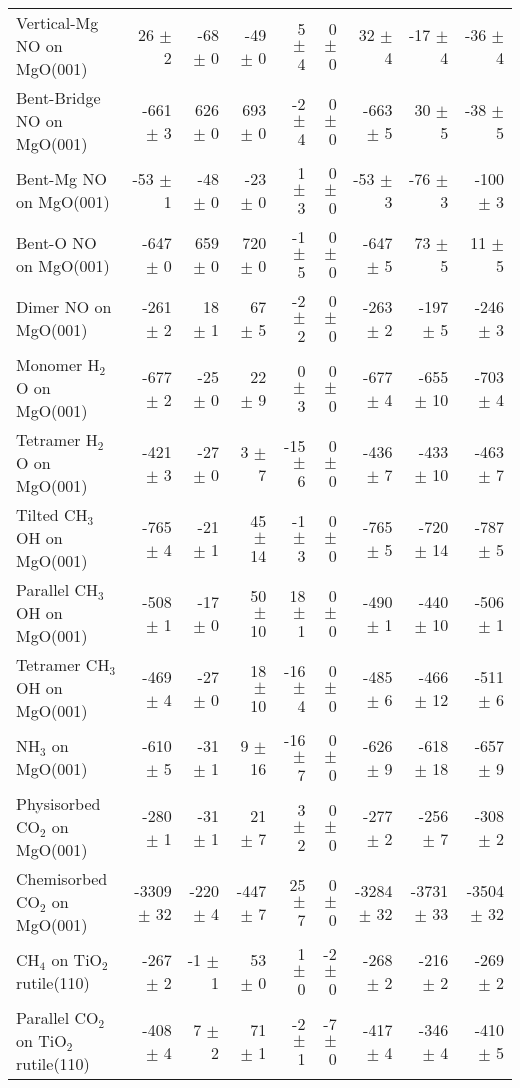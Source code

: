 \begin{table}
\begin{adjustbox}{center,max width=0.9\textwidth}
\begin{tabular}{lrrrrrrrr}
Vertical-Mg NO on MgO(001) & 26 $\pm$ 2 & -68 $\pm$ 0 & -49 $\pm$ 0 & 5 $\pm$ 4 & 0 $\pm$ 0 & 32 $\pm$ 4 & -17 $\pm$ 4 & -36 $\pm$ 4 \\
Bent-Bridge NO on MgO(001) & -661 $\pm$ 3 & 626 $\pm$ 0 & 693 $\pm$ 0 & -2 $\pm$ 4 & 0 $\pm$ 0 & -663 $\pm$ 5 & 30 $\pm$ 5 & -38 $\pm$ 5 \\
Bent-Mg NO on MgO(001) & -53 $\pm$ 1 & -48 $\pm$ 0 & -23 $\pm$ 0 & 1 $\pm$ 3 & 0 $\pm$ 0 & -53 $\pm$ 3 & -76 $\pm$ 3 & -100 $\pm$ 3 \\
Bent-O NO on MgO(001) & -647 $\pm$ 0 & 659 $\pm$ 0 & 720 $\pm$ 0 & -1 $\pm$ 5 & 0 $\pm$ 0 & -647 $\pm$ 5 & 73 $\pm$ 5 & 11 $\pm$ 5 \\
Dimer NO on MgO(001) & -261 $\pm$ 2 & 18 $\pm$ 1 & 67 $\pm$ 5 & -2 $\pm$ 2 & 0 $\pm$ 0 & -263 $\pm$ 2 & -197 $\pm$ 5 & -246 $\pm$ 3 \\
Monomer H$_2$O on MgO(001) & -677 $\pm$ 2 & -25 $\pm$ 0 & 22 $\pm$ 9 & 0 $\pm$ 3 & 0 $\pm$ 0 & -677 $\pm$ 4 & -655 $\pm$ 10 & -703 $\pm$ 4 \\
Tetramer H$_2$O on MgO(001) & -421 $\pm$ 3 & -27 $\pm$ 0 & 3 $\pm$ 7 & -15 $\pm$ 6 & 0 $\pm$ 0 & -436 $\pm$ 7 & -433 $\pm$ 10 & -463 $\pm$ 7 \\
Tilted CH$_3$OH on MgO(001) & -765 $\pm$ 4 & -21 $\pm$ 1 & 45 $\pm$ 14 & -1 $\pm$ 3 & 0 $\pm$ 0 & -765 $\pm$ 5 & -720 $\pm$ 14 & -787 $\pm$ 5 \\
Parallel CH$_3$OH on MgO(001) & -508 $\pm$ 1 & -17 $\pm$ 0 & 50 $\pm$ 10 & 18 $\pm$ 1 & 0 $\pm$ 0 & -490 $\pm$ 1 & -440 $\pm$ 10 & -506 $\pm$ 1 \\
Tetramer CH$_3$OH on MgO(001) & -469 $\pm$ 4 & -27 $\pm$ 0 & 18 $\pm$ 10 & -16 $\pm$ 4 & 0 $\pm$ 0 & -485 $\pm$ 6 & -466 $\pm$ 12 & -511 $\pm$ 6 \\
NH$_3$ on MgO(001) & -610 $\pm$ 5 & -31 $\pm$ 1 & 9 $\pm$ 16 & -16 $\pm$ 7 & 0 $\pm$ 0 & -626 $\pm$ 9 & -618 $\pm$ 18 & -657 $\pm$ 9 \\
Physisorbed CO$_2$ on MgO(001) & -280 $\pm$ 1 & -31 $\pm$ 1 & 21 $\pm$ 7 & 3 $\pm$ 2 & 0 $\pm$ 0 & -277 $\pm$ 2 & -256 $\pm$ 7 & -308 $\pm$ 2 \\
Chemisorbed CO$_2$ on MgO(001) & -3309 $\pm$ 32 & -220 $\pm$ 4 & -447 $\pm$ 7 & 25 $\pm$ 7 & 0 $\pm$ 0 & -3284 $\pm$ 32 & -3731 $\pm$ 33 & -3504 $\pm$ 32 \\
CH$_4$ on TiO$_2$ rutile(110) & -267 $\pm$ 2 & -1 $\pm$ 1 & 53 $\pm$ 0 & 1 $\pm$ 0 & -2 $\pm$ 0 & -268 $\pm$ 2 & -216 $\pm$ 2 & -269 $\pm$ 2 \\
Parallel CO$_2$ on TiO$_2$ rutile(110) & -408 $\pm$ 4 & 7 $\pm$ 2 & 71 $\pm$ 1 & -2 $\pm$ 1 & -7 $\pm$ 0 & -417 $\pm$ 4 & -346 $\pm$ 4 & -410 $\pm$ 5 \\

\end{tabular}
\end{adjustbox}
\end{table}
